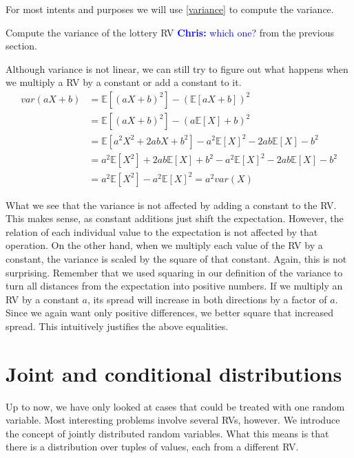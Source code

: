 \documentclass[a4paper,11pt,leqno]{report}
\newcommand{\chris}[1]{ \textcolor{blue}{\textbf{Chris:} #1}}
\newcommand{\E}{\mathbb{E}}
\begin{document}
For most intents and purposes we will use \eqref{variance} to compute the variance. 


\begin{Exercise}
Compute the variance of the lottery RV\chris{which one?} from the previous section.
\end{Exercise}

Although variance is not linear, we can still try to figure out what happens when we multiply a RV by a constant or add a constant to it.
\begin{align}
var(aX+b) &= \E[(aX+b)^{2}] - (\E[aX+b])^{2} \\
&= \E[(aX+b)^{2}] - (a\E[X]+b)^{2} \\
&= \E[a^{2}X^{2} + 2abX + b^{2}] - a^{2}\E[X]^{2} - 2ab\E[X] - b^{2} \\
&= a^{2}\E[X^{2}] + 2ab\E[X] + b^{2} - a^{2}\E[X]^{2} - 2ab\E[X] - b^{2} \\
&= a^{2}\E[X^{2}] - a^{2}\E[X]^{2} = a^{2}var(X) \
\end{align}

What we see that the variance is not affected by adding a constant to the RV. This makes sense, as constant additions just shift
the expectation. However, the relation of each individual value to the expectation is not affected by that operation. On the other hand,
when we multiply each value of the RV by a constant, the variance is scaled by the square of that constant. Again, this is not surprising.
Remember that we used squaring in our definition of the variance to turn all distances from the expectation into positive numbers.
If we multiply an RV by a constant $ a $, its spread will increase in both directions by a factor of $ a $. 
Since we again want only positive differences,
we better square that increased spread. This intuitively justifies the above equalities.



\section{Joint and conditional distributions}

Up to now, we have only looked at cases that could be treated with one random variable. Most interesting problems involve several RVs, however. We introduce the concept of jointly distributed random variables. What this means is that
there is a distribution over tuples of values, each from a different RV.
\end{document}
